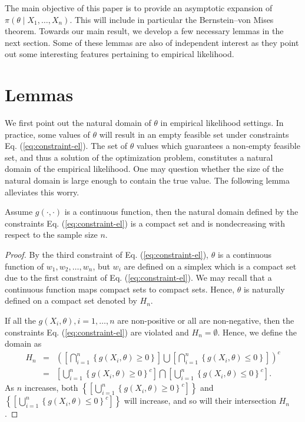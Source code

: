 The main objective of this paper is to provide an asymptotic expansion
of $\pi\left(\theta\mid X_{1},\ldots,X_{n}\right)$. This will include
in particular the Bernstein--von Mises theorem. Towards our main result, we
develop a few necessary lemmas in the next section. Some of these lemmas are also of independent interest as they point out some interesting features pertaining to empirical likelihood. 


\section{Lemmas}

We first point out the natural domain of $\theta$ in empirical likelihood settings. In practice, some values of $\theta$ will result in an empty feasible set under constraints Eq. (\ref{eq:constraint-el}). The set of $\theta$ values which guarantees a non-empty feasible set, and thus a solution of the optimization problem, constitutes a natural domain of the empirical likelihood. One may question whether the size of the natural domain is large enough to contain the true value. The following lemma alleviates this worry.
\begin{lemma}
Assume $g(\cdot,\cdot)$ is a continuous function, then the natural domain defined by the constraints Eq. (\ref{eq:constraint-el}) is a compact set and is nondecreasing with respect to the sample size $n$. 
\end{lemma}
\begin{proof}
By
the third constraint of Eq. (\ref{eq:constraint-el}), $\theta$ is a
continuous function of $w_{1},w_{2},\ldots,w_{n}$, but $w_{i}$ are
defined on a simplex which is a compact set due to the first constraint  of Eq. (\ref{eq:constraint-el}). We may recall that a continuous function
maps compact sets to compact sets. Hence, $\theta$ is naturally defined
on a compact set denoted by $H_n$. 

If all the $g(X_i,\theta),i=1,\ldots,n$ are non-positive or all are non-negative, then the constraints Eq. (\ref{eq:constraint-el}) are violated and $H_n=\emptyset$. Hence, we define the domain as
\begin{eqnarray*}
	H_n&=&\left( \left[\bigcap_{i=1}^n\left\{g\left(X_i,\theta\right)\ge 0\right\}\right]\bigcup  \left[\bigcap_{i=1}^n\left\{g\left(X_i,\theta\right)\le 0\right\}\right] \right)^c\\
	&=& \left[\bigcup_{i=1}^n\left\{g\left(X_i,\theta\right)\ge 0\right\}^c\right]\bigcap  \left[\bigcup_{i=1}^n\left\{g\left(X_i,\theta\right)\le 0\right\}^c\right].
\end{eqnarray*}
As $n$ increases, both $\left\{\left[\bigcup_{i=1}^n\left\{g\left(X_i,\theta\right)\ge 0\right\}^c\right]\right\} $ and 
$\left\{\left[\bigcup_{i=1}^n\left\{g\left(X_i,\theta\right)\le 0\right\}^c\right]\right\} $ will increase, and  so will their intersection $H_n$.
\end{proof}

